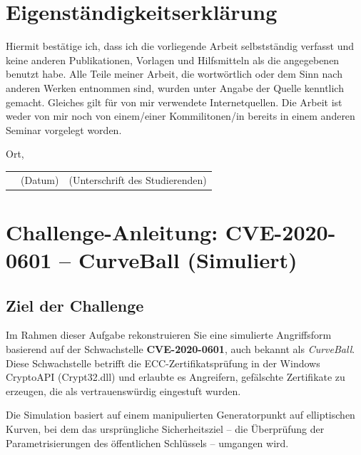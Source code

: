 \documentclass{article}
\begin{document}

\section*{Eigenständigkeitserklärung}
Hiermit bestätige ich, dass ich die vorliegende Arbeit selbstständig verfasst und keine anderen Publikationen, Vorlagen und Hilfsmitteln als die angegebenen benutzt habe. Alle Teile meiner Arbeit, die wortwörtlich oder dem Sinn nach anderen Werken entnommen sind, wurden unter Angabe der Quelle kenntlich gemacht. Gleiches gilt für von mir verwendete Internetquellen. Die Arbeit ist weder von mir noch von einem/einer Kommilitonen/in bereits in einem anderen Seminar vorgelegt worden. 

\vspace{1cm}

Ort, \underline{\hspace{0.815\textwidth}}\\
\begin{tabular}{lll}
\hspace{3cm} & \small(Datum)\hspace{1cm} & \hspace{2cm}\small(Unterschrift des Studierenden) \normalsize 
\end{tabular}

\newpage

\section*{Challenge-Anleitung: CVE-2020-0601 – CurveBall (Simuliert)}

\subsection{Ziel der Challenge}

Im Rahmen dieser Aufgabe rekonstruieren Sie eine simulierte Angriffsform basierend auf der Schwachstelle \textbf{CVE-2020-0601}, auch bekannt als \textit{CurveBall}. Diese Schwachstelle betrifft die ECC-Zertifikatsprüfung in der Windows CryptoAPI (Crypt32.dll) und erlaubte es Angreifern, gefälschte Zertifikate zu erzeugen, die als vertrauenswürdig eingestuft wurden.

Die Simulation basiert auf einem manipulierten Generatorpunkt auf elliptischen Kurven, bei dem das ursprüngliche Sicherheitsziel – die Überprüfung der Parametrisierungen des öffentlichen Schlüssels – umgangen wird.
\end{document}
